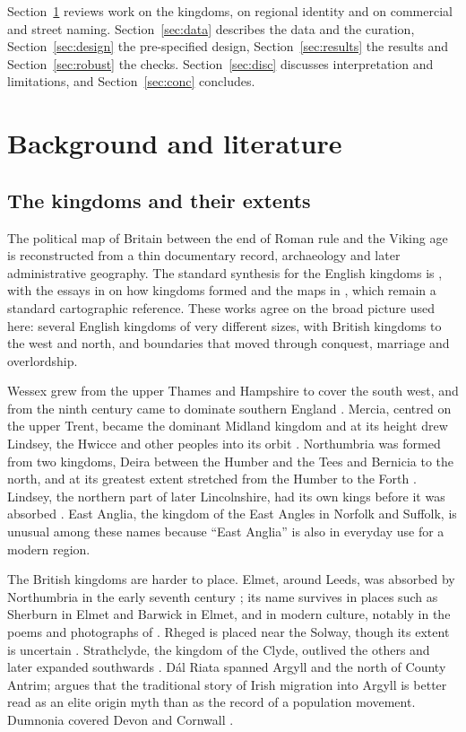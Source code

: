 \documentclass[11pt,a4paper]{article}
\begin{document}
Section~\ref{sec:lit} reviews work on the kingdoms, on regional identity and on commercial and street naming. Section~\ref{sec:data} describes the data and the curation, Section~\ref{sec:design} the pre-specified design, Section~\ref{sec:results} the results and Section~\ref{sec:robust} the checks. Section~\ref{sec:disc} discusses interpretation and limitations, and Section~\ref{sec:conc} concludes.

\section{Background and literature}\label{sec:lit}
\subsection{The kingdoms and their extents}
The political map of Britain between the end of Roman rule and the Viking age is reconstructed from a thin documentary record, archaeology and later administrative geography. The standard synthesis for the English kingdoms is \citet{yorke1990}, with the essays in \citet{bassett1989} on how kingdoms formed and the maps in \citet{hill1981}, which remain a standard cartographic reference. These works agree on the broad picture used here: several English kingdoms of very different sizes, with British kingdoms to the west and north, and boundaries that moved through conquest, marriage and overlordship.

Wessex grew from the upper Thames and Hampshire to cover the south west, and from the ninth century came to dominate southern England \citep{yorke1990}. Mercia, centred on the upper Trent, became the dominant Midland kingdom and at its height drew Lindsey, the Hwicce and other peoples into its orbit \citep{brownfarr2001}. Northumbria was formed from two kingdoms, Deira between the Humber and the Tees and Bernicia to the north, and at its greatest extent stretched from the Humber to the Forth \citep{rollason2003}. Lindsey, the northern part of later Lincolnshire, had its own kings before it was absorbed \citep{vince1993}. East Anglia, the kingdom of the East Angles in Norfolk and Suffolk, is unusual among these names because ``East Anglia'' is also in everyday use for a modern region.

The British kingdoms are harder to place. Elmet, around Leeds, was absorbed by Northumbria in the early seventh century \citep{yorke1990}; its name survives in places such as Sherburn in Elmet and Barwick in Elmet, and in modern culture, notably in the poems and photographs of \citet{hughes1979}. Rheged is placed near the Solway, though its extent is uncertain \citep{mccarthy2002}. Strathclyde, the kingdom of the Clyde, outlived the others and later expanded southwards \citep{clarkson2014}. Dál Riata spanned Argyll and the north of County Antrim; \citet{campbell2001} argues that the traditional story of Irish migration into Argyll is better read as an elite origin myth than as the record of a population movement. Dumnonia covered Devon and Cornwall \citep{pearce1978,pearce2004}.
\end{document}
